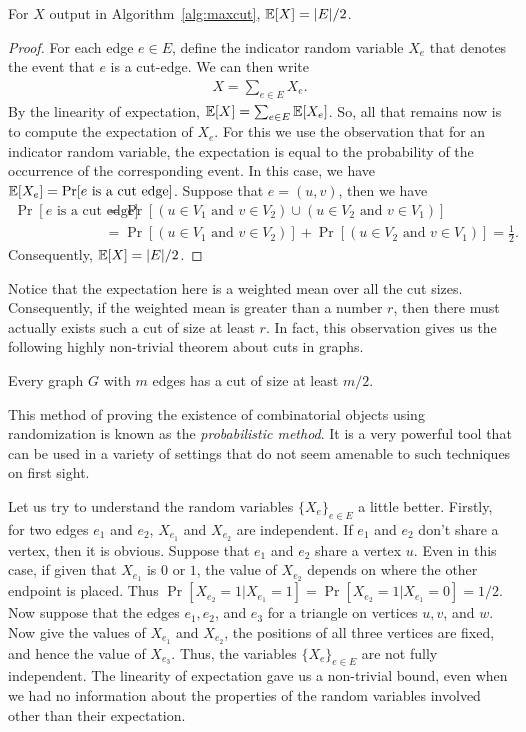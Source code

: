\begin{lemma}
	For $X$ output in Algorithm~\ref{alg:maxcut}, $\mathbb{E}[X] = |E|/2$.
	\label{lem:size-maxcut}
\end{lemma}
\begin{proof}
	For each edge $e\in E$, define the indicator random variable $X_e$ that denotes the event that $e$ is a cut-edge. We can then write 
	\begin{align*}
		X = \sum_{e\in E} X_e.
	\end{align*}
	By the linearity of expectation, $\mathbb{E}[X] = \sum_{e\in E} \mathbb{E}[X_e]$. So, all that remains now is to compute the expectation of $X_e$. For this we use the observation that for an indicator random variable, the expectation is equal to the probability of the occurrence of the corresponding event. In this case, we have $\mathbb{E}[X_e] = \Pr[\text{$e$ is a cut edge}]$. Suppose that $e=(u,v)$, then we have
	\begin{align*}
		\Pr[\text{$e$ is a cut edge}] &= \Pr[(u \in V_1 \text{ and } v\in V_2) \cup (u \in V_2 \text{ and } v\in V_1)]\\
		&= \Pr[(u \in V_1 \text{ and } v\in V_2)] + \Pr[(u \in V_2 \text{ and } v\in V_1)] = \frac{1}{2}.
	\end{align*}
	Consequently, $\mathbb{E}[X] = |E|/2$.
\end{proof}

Notice that the expectation here is a weighted mean over all the cut sizes. Consequently, if the weighted mean is greater than a number $r$, then there must actually exists such a cut of size at least $r$. In fact, this observation gives us the following highly non-trivial theorem about cuts in graphs.

\begin{theorem}
	Every graph $G$ with $m$ edges has a cut of size at least $m/2$.
	\label{thm:maxcut}
\end{theorem}

This method of proving the existence of combinatorial objects using randomization is known as the \emph{probabilistic method}. It is a very powerful tool that can be used in a variety of settings that do not seem amenable to such techniques on first sight.

Let us try to understand the random variables $\{X_e\}_{e\in E}$ a little better. Firstly, for two edges $e_1$ and $e_2$, $X_{e_1}$ and $X_{e_2}$ are independent. If $e_1$ and $e_2$ don't share a vertex, then it is obvious. Suppose that $e_1$ and $e_2$ share a vertex $u$. Even in this case, if given that $X_{e_1}$ is $0$ or $1$, the value of $X_{e_2}$ depends on where the other endpoint is placed. Thus $\Pr[X_{e_2}=1 | X_{e_1}=1] = \Pr[X_{e_2}=1 | X_{e_1}=0] = 1/2$. Now suppose that the edges $e_1, e_2$, and $e_3$ for a triangle on vertices $u,v$, and $w$. Now give the values of $X_{e_1}$ and $X_{e_2}$, the positions of all three vertices are fixed, and hence the value of $X_{e_3}$. Thus, the variables $\{X_e\}_{e\in E}$ are not fully independent. The linearity of expectation gave us a non-trivial bound, even when we had no information about the properties of the random variables involved other than their expectation.